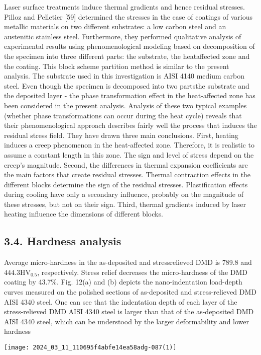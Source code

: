 \documentclass[10pt]{article}
\begin{document}
Laser surface treatments induce thermal gradients and hence residual stresses. Pilloz and Pelletier [59] determined the stresses in the case of coatings of various metallic materials on two different substrates: a low carbon steel and an austenitic stainless steel. Furthermore, they performed qualitative analysis of experimental results using phenomenological modeling based on decomposition of the specimen into three different parts: the substrate, the heataffected zone and the coating. This block scheme partition method is similar to the present analysis. The substrate used in this investigation is AISI 4140 medium carbon steel. Even though the specimen is decomposed into two partsthe substrate and the deposited layer - the phase transformation effect in the heat-affected zone has been considered in the present analysis. Analysis of these two typical examples (whether phase transformations can occur during the heat cycle) reveals that their phenomenological approach describes fairly well the process that induces the residual stress field. They have drawn three main conclusions. First, heating induces a creep phenomenon in the heat-affected zone. Therefore, it is realistic to assume a constant length in this zone. The sign and level of stress depend on the creep's magnitude. Second, the differences in thermal expansion coefficients are the main factors that create residual stresses. Thermal contraction effects in the different blocks determine the sign of the residual stresses. Plastification effects during cooling have only a secondary influence, probably on the magnitude of these stresses, but not on their sign. Third, thermal gradients induced by laser heating influence the dimensions of different blocks.

\subsection*{3.4. Hardness analysis}
Average micro-hardness in the as-deposited and stressrelieved DMD is 789.8 and $444.3 \mathrm{HV}_{0.5}$, respectively. Stress relief decreases the micro-hardness of the DMD coating by 43.7\%. Fig. 12(a) and (b) depicts the nano-indentation load-depth curves measured on the polished sections of as-deposited and stress-relieved DMD AISI 4340 steel. One can see that the indentation depth of each layer of the stress-relieved DMD AISI 4340 steel is larger than that of the as-deposited DMD AISI 4340 steel, which can be understood by the larger deformability and lower hardness

\begin{center}
\texttt{[image: 2024\_03\_11\_110695f4abfe14ea58adg-087(1)]}
\end{center}
\end{document}
